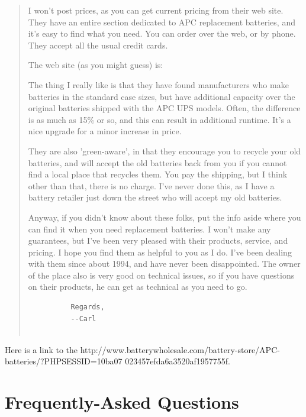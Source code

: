 {{{{{{\begin{quote}
I won't post prices, as you can get current pricing from their web site. They
have an entire section dedicated to APC replacement batteries, and it's easy
to find what you need. You can order over the web, or by phone. They accept
all the usual credit cards.  

The web site (as you might guess) is: 

The thing I really like is that they have found manufacturers who make
batteries in the standard case sizes, but have additional capacity over the
original batteries shipped with the APC UPS models. Often, the difference is
as much as 15\% or so, and this can result in additional runtime. It's a nice
upgrade for a minor increase in price.  

They are also 'green-aware', in that they encourage you to recycle your old
batteries, and will accept the old batteries back from you if you cannot find
a local place that recycles them. You pay the shipping, but I think other than
that, there is no charge. I've never done this, as I have a battery retailer
just down the street who will accept my old batteries.  

Anyway, if you didn't know about these folks, put the info aside where you can
find it when you need replacement batteries. I won't make any guarantees, but
I've been very pleased with their products, service, and pricing. I hope you
find them as helpful to you as I do. I've been dealing with them since about
1994, and have never been disappointed. The owner of the place also is very
good on technical issues, so if you have questions on their products, he can
get as technical as you need to go.  

\footnotesize
\begin{verbatim}
          Regards,
          --Carl
     
\end{verbatim}
\normalsize

\end{quote}

Here is a link to the 
{http://www.batterywholesale.com/battery-store/APC-batteries/?PHPSESSID=10ba07%
023457efda6a3520af1957755f}. 

\label{Frequently_002dAsked-Questions}

\section*{Frequently-Asked Questions}

}}}}}}
